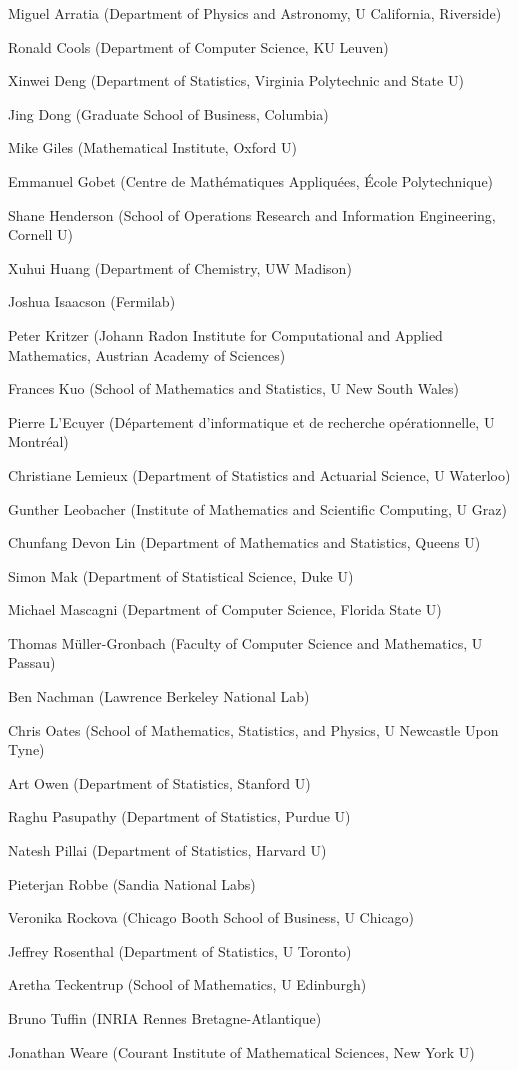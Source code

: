 Miguel Arratia (Department of Physics and Astronomy, U California, Riverside)

Ronald Cools (Department of Computer Science, KU Leuven)

Xinwei Deng (Department of Statistics, Virginia Polytechnic and State U)

Jing Dong (Graduate School of Business, Columbia)

Mike Giles (Mathematical Institute, Oxford U)

Emmanuel Gobet (Centre de Mathématiques Appliquées, École Polytechnique)

Shane Henderson (School of Operations Research and Information Engineering, Cornell U)

Xuhui Huang (Department of Chemistry, UW Madison)

Joshua Isaacson (Fermilab)

Peter Kritzer (Johann Radon Institute for Computational and Applied Mathematics, Austrian Academy of Sciences)

Frances Kuo (School of Mathematics and Statistics, U New South Wales)

Pierre L'Ecuyer (Département d'informatique et de recherche opérationnelle, U Montréal)

Christiane Lemieux (Department of Statistics and Actuarial Science, U Waterloo)

Gunther Leobacher (Institute of Mathematics and Scientific Computing, U Graz)

Chunfang Devon Lin (Department of Mathematics and Statistics, Queens U)

Simon Mak (Department of Statistical Science, Duke U)

Michael Mascagni (Department of Computer Science, Florida State U)

Thomas Müller-Gronbach (Faculty of Computer Science and Mathematics, U Passau)

Ben Nachman (Lawrence Berkeley National Lab)

Chris Oates (School of Mathematics, Statistics, and Physics, U Newcastle Upon Tyne)

Art Owen (Department of Statistics, Stanford U)

Raghu Pasupathy (Department of Statistics, Purdue U)

Natesh Pillai (Department of Statistics, Harvard U)

Pieterjan Robbe (Sandia National Labs)

Veronika Rockova (Chicago Booth School of Business, U Chicago)

Jeffrey Rosenthal (Department of Statistics, U Toronto)

Aretha Teckentrup (School of Mathematics, U Edinburgh)

Bruno Tuffin (INRIA Rennes Bretagne-Atlantique)

Jonathan Weare (Courant Institute of Mathematical Sciences, New York U)